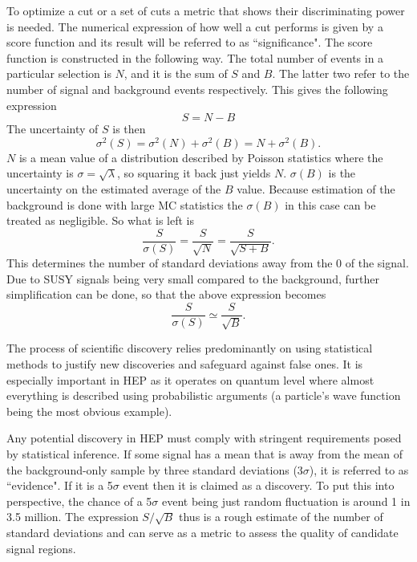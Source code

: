To optimize a cut or a set of cuts a metric that shows their discriminating power is needed. The numerical expression of how well a cut performs is given by a score function and its result will be referred to as ``significance". The score function is constructed in the following way.
The total number of events in a particular selection is $N$, and it is the sum of $S$ and $B$. The latter two refer to the number of signal and background events respectively. This gives the following expression
\begin{equation}
S = N -B
\end{equation}
The uncertainty of $S$ is then
\begin{equation}
\sigma^2(S) = \sigma^2(N) + \sigma^2(B) = N+\sigma^2(B).
\end{equation}
$N$ is a mean value of a distribution described by Poisson statistics where the uncertainty is $\sigma = \sqrt{\lambda}$, so squaring it back just yields $N$. 
$\sigma(B)$ is the uncertainty on the estimated average of the $B$ value. 
Because estimation of the background is done with large MC statistics the $\sigma(B)$ in this case can be treated as negligible. So what is left is
\begin{equation}
\frac{S}{\sigma(S)} = \frac{S}{\sqrt{N}} = \frac{S}{\sqrt{S+B}}.
\end{equation}
This determines the number of standard deviations away from the 0 of the signal. Due to SUSY signals being very small compared to the background, further simplification can be done, so that the above expression becomes
\begin{equation}
\frac{S}{\sigma(S)}\simeq \frac{S}{\sqrt{B}}.
\end{equation} 

The process of scientific discovery relies predominantly on using statistical methods to justify new discoveries and safeguard against false ones. It is especially important in HEP as it operates on quantum level where almost everything is described using probabilistic arguments (a particle's wave function being the most obvious example).
  
Any potential discovery in HEP must comply with stringent requirements posed by statistical inference. If some signal has a mean that is away from the mean of the background-only sample by three standard deviations (3$\sigma$), it is referred to as ``evidence". If it is a 5$\sigma$ event then it is claimed as a discovery. To put this into perspective, the chance of a 5$\sigma$ event being just random fluctuation is around 1 in 3.5 million. 
The expression $S/\sqrt{B}$ thus is a rough estimate of the number of standard deviations and can serve as a metric to assess the quality of candidate signal regions. 

